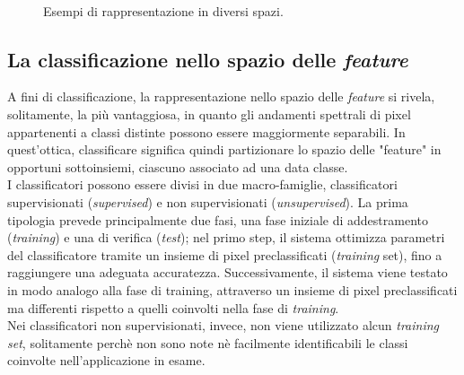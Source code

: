 \begin{figure}[!ht]
\center
{}
\hspace{3mm}
\\
\caption{Esempi di rappresentazione in diversi spazi.}
\label{fig:spaziorappresentazione}
\end{figure}



\subsection{La classificazione nello spazio delle \emph{feature}}

A fini di classificazione, la rappresentazione nello spazio delle \emph{feature} si rivela, solitamente, la più vantaggiosa, in quanto gli andamenti spettrali di pixel appartenenti a classi distinte possono essere maggiormente separabili. In quest'ottica, classificare significa quindi partizionare lo spazio delle "feature" in opportuni sottoinsiemi, ciascuno associato ad una data classe.
\\

I classificatori possono essere divisi in due macro-famiglie, classificatori supervisionati (\emph{supervised}) e non supervisionati (\emph{unsupervised}). La prima tipologia prevede principalmente due fasi, una fase iniziale di addestramento (\emph{training}) e una di verifica (\emph{test}); nel primo step, il sistema ottimizza parametri del classificatore tramite un insieme di pixel preclassificati (\emph{training} set), fino a raggiungere una adeguata accuratezza. Successivamente, il sistema viene testato in modo analogo alla fase di training, attraverso un insieme di pixel preclassificati ma differenti rispetto a quelli coinvolti nella fase di \emph{training}.\\
Nei classificatori non supervisionati, invece, non viene utilizzato alcun \emph{training set}, solitamente perchè non sono note nè facilmente identificabili le classi coinvolte nell'applicazione in esame. 
\\

